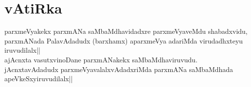 \section*{vAtiRka}


\begin{artha} 
parxmeVyakekx parxmANa saMbaMdhavidadxre parxmeVyaveMdu shabadxvidu, 
parxmANada PalavAdadudx (barxhamx) aparxmeVya adariMda virudadhxteyu 
iruvudilalx||\\
ajAcnxta vasutxvinoDane parxmANakekx saMbaMdhaviruvudu. 
jAcnxtavAdadudx parxmeVyavalalxvAdadxriMda parxmANa saMbaMdhada 
apeVkeSxyiruvudilalx||
\end{artha}

\begin{artha} 

\end{artha}

\begin{artha} 

\end{artha}

\begin{artha} 

\end{artha}

\begin{artha} 

\end{artha}

\begin{artha} 

\end{artha}

\begin{artha} 

\end{artha}

\begin{artha} 

\end{artha}

\begin{artha} 

\end{artha}

\begin{artha} 

\end{artha}






